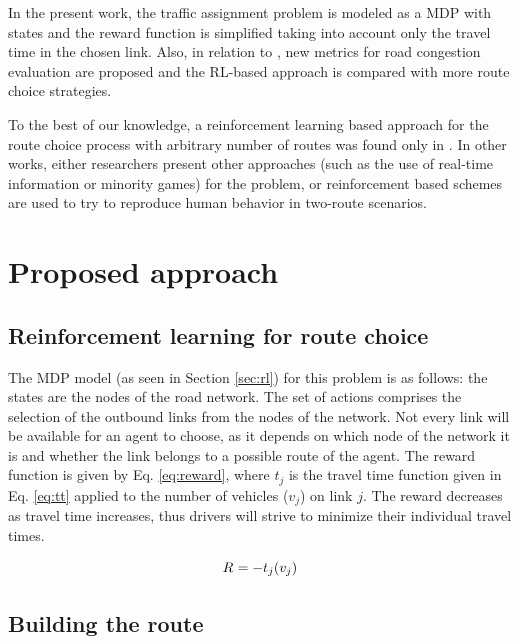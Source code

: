 \documentclass{RITA}
\newcommand{\travTime}{\ensuremath{t_j}} 	%
\newcommand{\veh}{\ensuremath{v}}		%
\newcommand{\reward}[1][]{\ensuremath{R_#1}}	%
\begin{document}
In the present work, the traffic assignment problem is modeled as a MDP with states and the reward function is simplified taking into account only the travel time in the chosen link. Also, in relation to \cite{Tavares&Bazzan2012}, new metrics for road congestion evaluation are proposed and the RL-based approach is compared with more route choice strategies. %

To the best of our knowledge, a reinforcement learning based approach for the route choice process with arbitrary number of routes was found only in \cite{Tavares&Bazzan2012}. In other works, either researchers present other approaches (such as the use of real-time information or minority games) for the problem, or reinforcement based schemes are used to try to reproduce human behavior in two-route scenarios.

\section{Proposed approach}
\label{sec:proposal}

\subsection{Reinforcement learning for route choice}

The MDP model (as seen in Section \ref{sec:rl}) for this problem is as follows: the states are the nodes of the  road network. The set of actions comprises the selection of the outbound links from the nodes of the network. Not every link will be available for an agent to choose, as it depends on which node of the network it is and whether the link belongs to a possible route of the agent. The reward function is given by Eq. \eqref{eq:reward}, where $\travTime$ is the travel time function given in Eq. \eqref{eq:tt} applied to the number of vehicles ($\veh_j$) on link $j$. The reward decreases as travel time increases, thus drivers will strive to minimize their individual travel times.

\begin{equation}
\label{eq:reward}
\reward{} = - \travTime(\veh_j)
\end{equation}

\subsection{Building the route}
\end{document}
